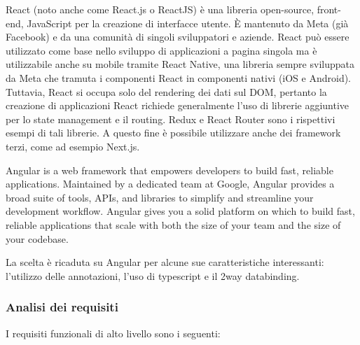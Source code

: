 \documentclass[a4paper,11pt]{article}
\begin{document}
React (noto anche come React.js o ReactJS) è una libreria open-source, front-end, JavaScript per la creazione di interfacce utente. È mantenuto da Meta (già Facebook) e da una comunità di singoli sviluppatori e aziende.
React può essere utilizzato come base nello sviluppo di applicazioni a pagina singola ma è utilizzabile anche su mobile tramite React Native, una libreria sempre sviluppata da Meta che tramuta i componenti React in componenti nativi (iOS e Android). Tuttavia, React si occupa solo del rendering dei dati sul DOM, pertanto la creazione di applicazioni React richiede generalmente l'uso di librerie aggiuntive per lo state management e il routing. Redux e React Router sono i rispettivi esempi di tali librerie. A questo fine è possibile utilizzare anche dei framework terzi, come ad esempio Next.js. \cite{wikipediaReactweb}

Angular is a web framework that empowers developers to build fast, reliable applications. Maintained by a dedicated team at Google, Angular provides a broad suite of tools, APIs, and libraries to simplify and streamline your development workflow. Angular gives you a solid platform on which to build fast, reliable applications that scale with both the size of your team and the size of your codebase. \cite{angularAngular}

La scelta è ricaduta su Angular per alcune sue caratteristiche interessanti: l'utilizzo delle annotazioni, l'uso di typescript e il 2way databinding.



\subsubsection{Analisi dei requisiti}

I requisiti funzionali di alto livello sono i seguenti:
\end{document}
